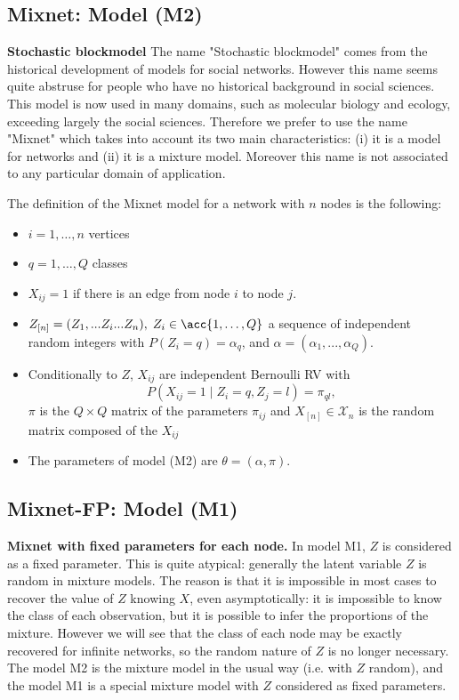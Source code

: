 \documentclass[11pt]{article}
\newcommand{\Xdefn}{\mathcal{X}_{n}}
\newcommand{\Xn}{X_{[n]}}
\newcommand{\Zn}{Z_{[n]}}
\begin{document}
\medskip


\subsection{Mixnet: Model (M2)}
{\bf Stochastic blockmodel}
The name "Stochastic blockmodel" comes from the historical development of models for
social networks. However this name seems quite abstruse for people who have no historical background in social sciences. This model is now used in many domains, such as molecular biology and ecology, exceeding largely the social sciences.
Therefore we prefer to use the name "Mixnet" which takes into account its two main characteristics: (i) it is a model for
networks and (ii) it is a mixture model. Moreover this name is not associated to any particular domain of application.

The definition of the Mixnet model for a network with $n$ nodes is the following:
\begin{itemize}
\item $i=1,\ldots,n$ vertices \item $q=1,\ldots,Q$ classes \item $X_{ij}=1$ if
there is an edge from node $i$ to node $j$.
 \item
$\Zn=(Z_1,...Z_i...Z_n), \; Z_i \in \acc{1,\ldots,Q}  $ a sequence of
independent random integers with $P(Z_i=q)=\alpha_q$, and
$\alpha=(\alpha_1,...,\alpha_Q)$.
 \item Conditionally to
$Z$, $X_{ij}$ are independent Bernoulli RV with
       $$P(X_{ij}=1\mid Z_i=q,Z_j=l)=\pi_{ql},$$  $\pi$ is the $Q\times Q$ matrix of the parameters
       $\pi_{ij}$ and $\Xn \in \Xdefn$ is the random matrix composed of the $X_{ij}$
       \item The parameters of model (M2) are  $\theta=(\alpha, \pi).$
\end{itemize}



\subsection{Mixnet-FP: Model (M1)}
{\bf Mixnet with fixed parameters for each node.}
In model M1, $Z$ is considered as a fixed parameter. This is quite atypical: generally the latent variable $Z$ is random in mixture models. The reason is that it is impossible in most cases to recover the value of $Z$ knowing $X$, even asymptotically: it is impossible to know the class of each observation, but it is possible to infer the proportions of the mixture. However we will see that the class of each node may be exactly recovered for infinite networks, so the random nature of $Z$ is no longer necessary. The model M2 is the mixture model in the usual way (i.e. with $Z$ random), and the model M1 is a special mixture model with $Z$ considered as fixed parameters.
\end{document}
